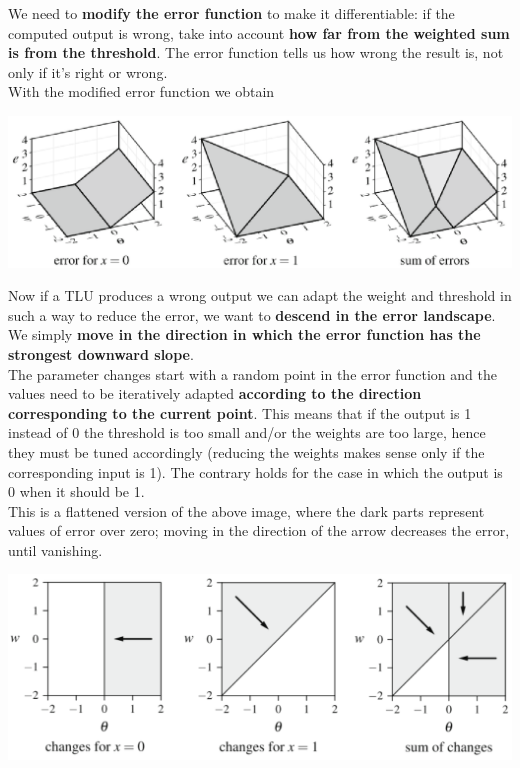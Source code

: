 \documentclass[11pt]{article}
\begin{document}
		\newpage
		
		We need to \textbf{modify the error function} to make it differentiable: if the computed output is wrong, take into account \textbf{how far from the weighted sum is from the threshold}. The error function tells us how wrong the result is, not only if it's right or wrong.\\
		
		With the modified error function we obtain
		\begin{center}
			\includegraphics[width=0.85\columnwidth]{img/NN/error2}
		\end{center}
		Now if a TLU produces a wrong output we can adapt the weight and threshold in such a way to reduce the error, we want to \textbf{descend in the error landscape}. We simply \textbf{move in the direction in which the error function has the strongest downward slope}.\\
		
		The parameter changes start with a random point in the error function and the values need to be iteratively adapted \textbf{according to the direction corresponding to the current point}. This means that if the output is 1 instead of 0 the threshold is too small and/or the weights are too large, hence they must be tuned accordingly (reducing the weights makes sense only if the corresponding input is 1). The contrary holds for the case in which the output is 0 when it should be 1.\\
		
		This is a flattened version of the above image, where the dark parts represent values of error over zero; moving in the direction of the arrow decreases the error, until vanishing.
		\begin{center}
			\includegraphics[width=0.8\columnwidth]{img/NN/error3}
		\end{center}
		
\end{document}
